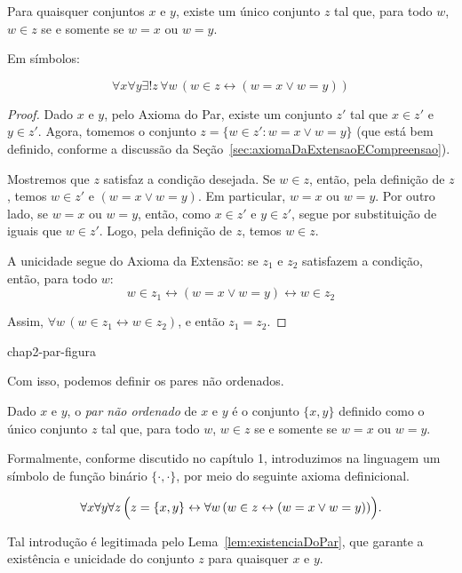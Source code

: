 \begin{lemma}[$\BST$]\label{lem:existenciaDoPar}
    Para quaisquer conjuntos $x$ e $y$, existe um único conjunto $z$ tal que, para todo $w$, $w \in z$ se e somente se $w = x$ ou $w = y$.

    Em símbolos:

    \[
    \forall x \forall y \exists! z\, \forall w\, (w \in z \leftrightarrow (w = x \lor w = y))
    \]
\end{lemma}

\begin{proof}
    Dado $x$ e $y$, pelo Axioma do Par, existe um conjunto $z'$ tal que $x \in z'$ e $y \in z'$.
    Agora, tomemos o conjunto $z = \{w \in z' : w = x \lor w = y\}$ (que está bem definido, conforme a discussão da Seção~\ref{sec:axiomaDaExtensaoECompreensao}).
    
    Mostremos que $z$ satisfaz a condição desejada.
    Se $w\in z$, então, pela definição de $z$, temos $w\in z'$ e
    $(w=x\lor w=y)$.
    Em particular, $w=x$ ou $w=y$.
    Por outro lado, se $w = x$ ou $w = y$, então, como $x \in z'$ e $y \in z'$, segue por substituição de iguais que $w \in z'$.
    Logo, pela definição de $z$, temos $w \in z$.

    A unicidade segue do Axioma da Extensão: se $z_1$ e $z_2$ satisfazem a condição, então, para todo $w$:
    \[
    w \in z_1 \leftrightarrow (w = x \lor w = y) \leftrightarrow w \in z_2
    \]

    Assim, $\forall w\, (w \in z_1 \leftrightarrow w \in z_2)$, e então $z_1 = z_2$.
\end{proof}

{chap2-par-figura}

Com isso, podemos definir os pares não ordenados.

\begin{definition}[$\BST$]\label{def:parNaoOrdenado}
    Dado $x$ e $y$, o \emph{par não ordenado} de $x$ e $y$ é o conjunto $\{x, y\}$ definido como o único conjunto $z$ tal que, para todo $w$, $w \in z$ se e somente se $w = x$ ou $w = y$.
    
    Formalmente, conforme discutido no capítulo 1, introduzimos na linguagem um símbolo de função binário $\{\cdot, \cdot\}$, por meio do seguinte axioma definicional.

    \[
        \forall x \forall y \forall z\, \Bigl(z = \{x, y\} \leftrightarrow \forall w\, (w \in z \leftrightarrow (w = x \lor w = y))\Bigr).
    \]

    Tal introdução é legitimada pelo Lema~\ref{lem:existenciaDoPar}, que garante a existência e unicidade do conjunto $z$ para quaisquer $x$ e $y$.
\end{definition}

